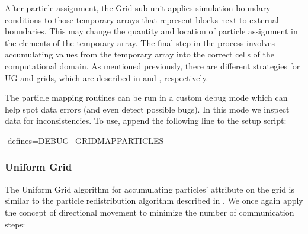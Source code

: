 After particle assignment, the \unit{Grid} sub-unit applies
simulation boundary conditions to those temporary arrays that
represent blocks next to external boundaries.  This may change the
quantity and location of particle assignment in the elements of the
temporary array.  The final step in the process involves accumulating
values from the temporary array into the correct cells of the
computational domain.  As mentioned previously, there are different
strategies for UG and \Paramesh grids, which are described in
 and
, respectively. 

\begin {flashtip}
The particle mapping routines can be run in a custom debug mode which
can help spot data errors (and even detect possible bugs).  In this
mode we inspect data for inconsistencies.  To use, append the
following line to the setup script:
\begin{codeseg}
-defines=DEBUG_GRIDMAPPARTICLES
\end{codeseg}
\end{flashtip}


\subsubsection{Uniform Grid}
\label{Sec:UniformGridParticleMap}

The Uniform Grid algorithm for accumulating particles' attribute on
the grid is similar to the particle redistribution algorithm described
in .  We once again apply the concept of
directional movement to minimize the number of communication steps:


